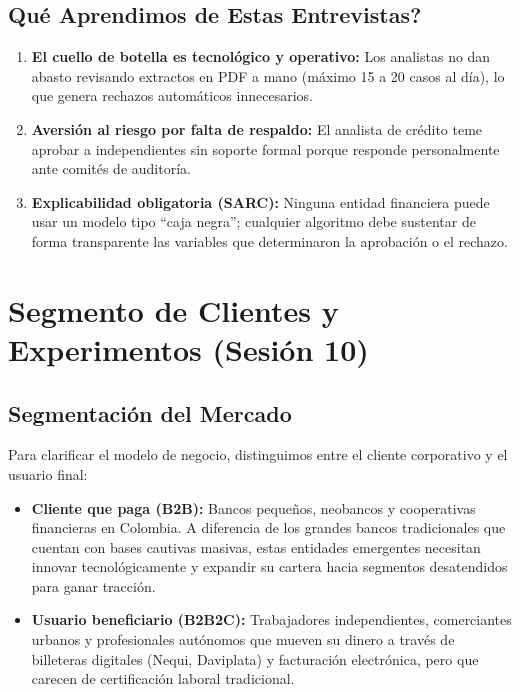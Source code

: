 \documentclass[11pt,a4paper]{article}
\begin{document}
\subsection{\textquestiondown Qu\'e Aprendimos de Estas Entrevistas?}
\begin{enumerate}[leftmargin=*]
    \item \textbf{El cuello de botella es tecnol\'ogico y operativo:} Los analistas no dan abasto revisando extractos en PDF a mano (m\'aximo 15 a 20 casos al d\'ia), lo que genera rechazos autom\'aticos innecesarios.
    \item \textbf{Aversi\'on al riesgo por falta de respaldo:} El analista de cr\'edito teme aprobar a independientes sin soporte formal porque responde personalmente ante comit\'es de auditor\'ia.
    \item \textbf{Explicabilidad obligatoria (SARC):} Ninguna entidad financiera puede usar un modelo tipo ``caja negra''; cualquier algoritmo debe sustentar de forma transparente las variables que determinaron la aprobaci\'on o el rechazo.
\end{enumerate}

\newpage

\section{Segmento de Clientes y Experimentos (Sesi\'on 10)}

\subsection{Segmentaci\'on del Mercado}
Para clarificar el modelo de negocio, distinguimos entre el cliente corporativo y el usuario final:
\begin{itemize}[leftmargin=*]
    \item \textbf{Cliente que paga (B2B):} Bancos peque\~nos, neobancos y cooperativas financieras en Colombia. A diferencia de los grandes bancos tradicionales que cuentan con bases cautivas masivas, estas entidades emergentes necesitan innovar tecnol\'ogicamente y expandir su cartera hacia segmentos desatendidos para ganar tracci\'on.
    \item \textbf{Usuario beneficiario (B2B2C):} Trabajadores independientes, comerciantes urbanos y profesionales aut\'onomos que mueven su dinero a trav\'es de billeteras digitales (Nequi, Daviplata) y facturaci\'on electr\'onica, pero que carecen de certificaci\'on laboral tradicional.
\end{itemize}
\end{document}
